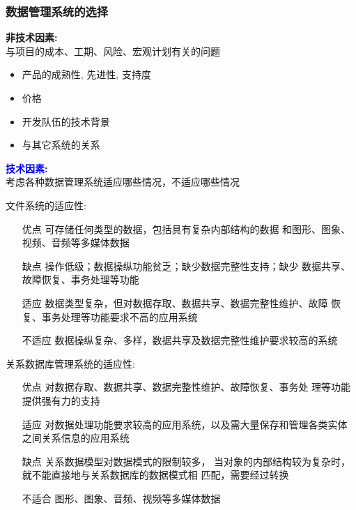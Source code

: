 \documentclass[compress]{beamer}
\begin{document}
\begin{frame}
  \frametitle{数据管理系统的选择}

   {
  \textbf{非技术因素:}  \\
    与项目的成本、工期、风险、宏观计划有关的问题  

  \begin{itemize}
    \item 产品的成熟性, 先进性, 支持度
    \item 价格
    \item 开发队伍的技术背景 
    \item 与其它系统的关系 
  \end{itemize}

  \textcolor{blue}{\textbf{技术因素:}} \\
  考虑各种数据管理系统适应哪些情况，不适应哪些情况 
}

   {
    文件系统的适应性:

    \begin{itemize}
      \item [优点] 可存储任何类型的数据，包括具有复杂内部结构的数据
        和图形、图象、视频、音频等多媒体数据

      \item [缺点] 操作低级；数据操纵功能贫乏；缺少数据完整性支持；缺少
        数据共享、故障恢复、事务处理等功能

      \item [适应] 数据类型复杂，但对数据存取、数据共享、数据完整性维护、故障
        恢复、事务处理等功能要求不高的应用系统

      \item [不适应] 数据操纵复杂、多样，数据共享及数据完整性维护要求较高的系统
    \end{itemize}
  }

   {
    关系数据库管理系统的适应性:
    \begin{itemize}
      \item [优点] 对数据存取、数据共享、数据完整性维护、故障恢复、事务处
        理等功能提供强有力的支持

      \item [适应] 对数据处理功能要求较高的应用系统，以及需大量保存和管理各类实体
        之间关系信息的应用系统

      \item [缺点] 关系数据模型对数据模式的限制较多， 
        当对象的内部结构较为复杂时，就不能直接地与关系数据库的数据模式相
        匹配，需要经过转换

      \item [不适合] 图形、图象、音频、视频等多媒体数据 
    \end{itemize}
  }


\end{frame}
\end{document}
